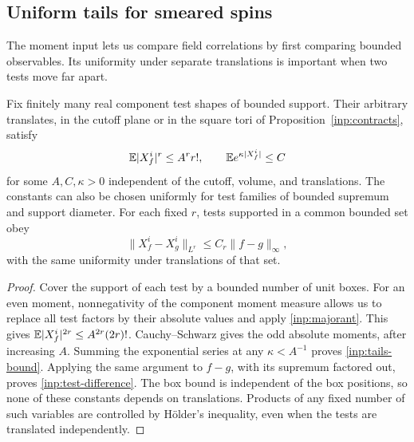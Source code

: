 \subsection{Uniform tails for smeared spins}

The moment input lets us compare field correlations by first comparing
bounded observables.  Its uniformity under separate translations is
important when two tests move far apart.

\begin{lemma}
\label{inp:tails}
Fix finitely many real component test shapes of bounded support.
Their arbitrary translates, in the cutoff plane or in the square
tori of Proposition~\ref{inp:contracts}, satisfy
\begin{equation}
 \mathbb E|X_f^i|^r\le A^r r!,\qquad
 \mathbb E e^{\kappa|X_f^i|}\le C
 \label{inp:tails-bound}
\end{equation}
for some $A,C,\kappa>0$ independent of the cutoff, volume, and
translations.  The constants can also be chosen uniformly for test
families of bounded supremum and support diameter.
For each fixed $r$, tests supported in a common bounded set obey
\begin{equation}
 \|X_f^i-X_g^i\|_{L^r}\le C_r\|f-g\|_\infty,
 \label{inp:test-difference}
\end{equation}
with the same uniformity under translations of that set.
\end{lemma}

\begin{proof}
Cover the support of each test by a bounded number of unit boxes.
For an even moment, nonnegativity of the component moment measure
allows us to replace all test factors by their absolute values and
apply \eqref{inp:majorant}.  This gives
$\mathbb E|X_f^i|^{2r}\le A^{2r}(2r)!$.
Cauchy--Schwarz gives the odd absolute moments, after increasing $A$.
Summing the exponential series at any $\kappa<A^{-1}$ proves
\eqref{inp:tails-bound}.  Applying the same argument to $f-g$, with
its supremum factored out, proves \eqref{inp:test-difference}.
The box bound is independent of the box positions, so none of these
constants depends on translations.  Products of any fixed number of
such variables are controlled by H\"older's inequality, even when the
tests are translated independently.
\end{proof}
